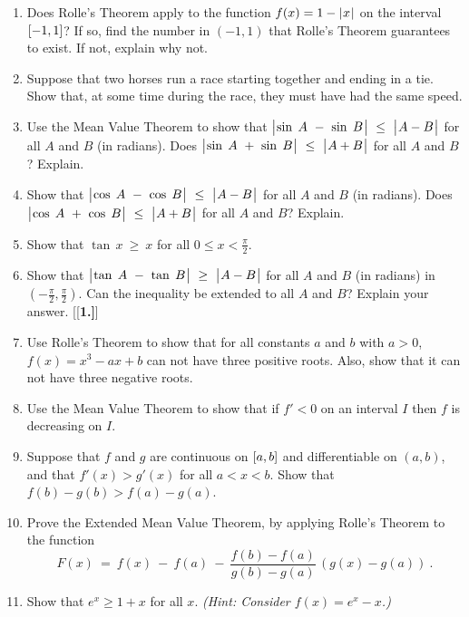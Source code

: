 \divider
\vspace{3mm}
\startexercises\label{sec4dot4}
{\small
{}
\begin{enumerate}[\bfseries 1.]
 \item Does Rolle's Theorem apply to the function $f(x) = 1 - \lvert\mspace{1mu}x\mspace{1mu}\rvert$ on the interval
 $\lbrack -1,1 \rbrack$? If so, find the number in  $(-1,1)$ that Rolle's Theorem guarantees
to exist. If not, explain why not.
 \item Suppose that two horses run a race starting together and ending in a tie. Show that, at some
  time during the race, they must have had the same speed.
 \item Use the Mean Value Theorem to show that $\bigl\lvert\mspace{1mu}\sin\;A ~-~ \sin\;B\mspace{1mu}\bigr\rvert ~\le~ \bigl\lvert\mspace{1mu}A-B\mspace{1mu}\bigr\rvert$ for all $A$ and $B$ (in radians).
  Does $\bigl\lvert\mspace{1mu}\sin\;A ~+~ \sin\;B\mspace{1mu}\bigr\rvert ~\le~ \bigl\lvert\mspace{1mu}A+B\mspace{1mu}\bigr\rvert$ for all $A$ and $B$? Explain.
 \item Show that $\bigl\lvert\mspace{1mu}\cos\;A ~-~ \cos\;B\mspace{1mu}\bigr\rvert ~\le~ \bigl\lvert\mspace{1mu}A-B\mspace{1mu}\bigr\rvert$ for all $A$ and $B$ (in radians).
  Does $\bigl\lvert\mspace{1mu}\cos\;A ~+~ \cos\;B\mspace{1mu}\bigr\rvert ~\le~ \bigl\lvert\mspace{1mu}A+B\mspace{1mu}\bigr\rvert$ for all $A$ and $B$? Explain.
 \item Show that $\tan\,x ~\ge~ x$ for all $0 \le x < \frac{\pi}{2}$.
 \item Show that $\bigl\lvert\mspace{1mu}\tan\;A ~-~ \tan\;B\mspace{1mu}\bigr\rvert ~\ge~ \bigl\lvert\mspace{1mu}A-B\mspace{1mu}\bigr\rvert$ for all $A$ and $B$ (in radians)
  in $\left(-\frac{\pi}{2},\frac{\pi}{2}\right)$. Can the inequality be extended to all
  $A$ and $B$? Explain your answer.
[{[\bfseries 1.]}]
 \item Use Rolle's Theorem to show that for all constants $a$ and $b$ with
  $a>0$, $f(x) = x^3 - ax + b   $ can not have three positive roots. Also, show
  that it can not have three negative roots.
 \item Use the Mean Value Theorem to show that if $f'<0$ on an interval $I$ then
 $f$ is decreasing on $I$.
 \item Suppose that $f$ and $g$ are continuous on $\lbrack a,b \rbrack$ and
  differentiable on $(a,b)$, and that $f'(x) > g'(x)$ for all $a < x < b$. Show
  that $f(b) - g(b) > f(a) - g(a)$.
 \item Prove the Extended Mean Value Theorem, by applying Rolle's Theorem to the
 function
\[
F(x) ~=~ f(x) ~-~ f(a) ~-~ \frac{f(b) - f(a)}{g(b) - g(a)}\,(g(x) - g(a)) ~.
\]
 \item\label{exer:exple1px} Show that $e^x \ge 1 + x$ for all $x$.
  \emph{(Hint: Consider $f(x)=e^x-x$.)}
\end{enumerate}}
